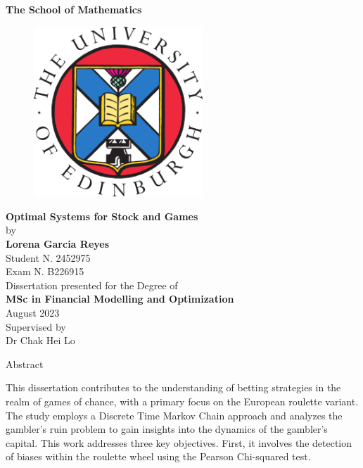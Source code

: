 \documentclass[11pt,twoside]{article}
\numberwithin{Theorem}{section}
\numberwithin{Definition}{section}
\numberwithin{Lemma}{section}
\numberwithin{Algorithm}{section}
\numberwithin{equation}{section}
\begin{document}
\pagestyle{empty}

\begin{titlepage}
\vspace*{.5em}
\center
\textbf{\Large{The School of Mathematics\\}}
\vspace*{1em}
\begin{figure}[!h]
\centering
\includegraphics[width=180pt]{UoE_logo.png}
\end{figure}
\vspace{2em}
\textbf{\LARGE{Optimal Systems for Stock and Games}}\\[2em]
\Large{by}\\
\vspace{2em}
\textbf{\Large{Lorena Garcia Reyes}}\\
\Large{Student N. 2452975}\\
\Large{Exam N. B226915}\\
\vspace{6.5em}
\Large{Dissertation presented for the Degree of\\
\textbf{MSc in Financial Modelling and Optimization}\\}
\vspace{5em}
\Large{August 2023}\\
\vspace{3em}
\Large{Supervised by\\Dr Chak Hei Lo}
\vfill
\end{titlepage}

\cleardoublepage


\begin{center}
\Large{Abstract}
\end{center}

This dissertation contributes to the understanding of betting strategies in the realm of games of chance, with a primary focus on the European roulette variant. The study employs a Discrete Time Markov Chain approach and analyzes the gambler’s ruin problem to gain insights into the dynamics of the gambler’s capital. This work addresses three key objectives. First, it involves the detection of biases within the roulette wheel using the Pearson Chi-squared test. 
\end{document}
